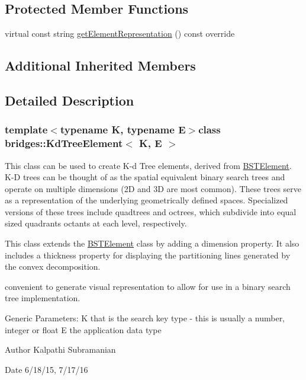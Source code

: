 \subsection*{Protected Member Functions}
\begin{DoxyCompactItemize}
\item 
virtual const string \hyperlink{classbridges_1_1_kd_tree_element_ab69079d403c51b31e2da02966f09615e}{get\+Element\+Representation} () const  override
\end{DoxyCompactItemize}
\subsection*{Additional Inherited Members}


\subsection{Detailed Description}
\subsubsection*{template$<$typename K, typename E$>$class bridges\+::\+Kd\+Tree\+Element$<$ K, E $>$}

This class can be used to create K-\/d Tree elements, derived from \hyperlink{classbridges_1_1_b_s_t_element}{B\+S\+T\+Element}. K-\/\+D trees can be thought of as the spatial equivalent binary search trees and operate on multiple dimensions (2\+D and 3\+D are most common). These trees serve as a representation of the underlying geometrically defined spaces. Specialized versions of these trees include quadtrees and octrees, which subdivide into equal sized quadrants octants at each level, respectively. 

This class extends the \hyperlink{classbridges_1_1_b_s_t_element}{B\+S\+T\+Element} class by adding a dimension property. It also includes a thickness property for displaying the partitioning lines generated by the convex decomposition.

convenient to generate visual representation to allow for use in a binary search tree implementation.

Generic Parameters\+: K that is the search key type -\/ this is usually a number, integer or float E the application data type

\begin{DoxyAuthor}{Author}
Kalpathi Subramanian 
\end{DoxyAuthor}
\begin{DoxyDate}{Date}
6/18/15, 7/17/16 
\end{DoxyDate}


